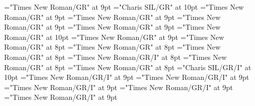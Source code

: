 \documentclass[gps1,twoside]{article}
\begin{document}
\font\spanpronunciationspansubentrysubentriesentrysubentriesdiventryletData="Times New Roman/GR" at 9pt
\font\spanbzhfonipaspanpronunciationspansubentrysubentriesentrysubentriesdiventryletData="Charis SIL/GR" at 10pt
\font\sensessubentrysubentriesentryaftersubentrysubentriesentrysubentriesdiventryletData="Times New Roman/GR" at 9pt
\font\spanspansubentrysubentriesentrysubentriesdiventryletData="Times New Roman/GR" at 9pt
\font\sensespanspansubentrysubentriesentrysubentriesdiventryletData="Times New Roman/GR" at 9pt
\font\spansensespanspansubentrysubentriesentrysubentriesdiventryletData="Times New Roman/GR" at 9pt
\font\spanenspansensespanspansubentrysubentriesentrysubentriesdiventryletData="Times New Roman/GR" at 10pt
\font\examplessensesensessubentrysubentriesentryaftersensespanspansubentrysubentriesentrysubentriesdiventryletData="Times New Roman/GR" at 9pt
\font\examplespansensespanspansubentrysubentriesentrysubentriesdiventryletData="Times New Roman/GR" at 8pt
\font\examplebeforespansensespanspansubentrysubentriesentrysubentriesdiventryletData="Times New Roman/GR" at 8pt
\font\exampleafterspansensespanspansubentrysubentriesentrysubentriesdiventryletData="Times New Roman/GR" at 8pt
\font\exampleexamplespansensespanspansubentrysubentriesentrysubentriesdiventryletData="Times New Roman/GR/I" at 8pt
\font\examplebeforeexamplespansensespanspansubentrysubentriesentrysubentriesdiventryletData="Times New Roman/GR" at 8pt
\font\exampleafterexamplespansensespanspansubentrysubentriesentrysubentriesdiventryletData="Times New Roman/GR" at 8pt
\font\spanbzhexampleexamplespansensespanspansubentrysubentriesentrysubentriesdiventryletData="Charis SIL/GR/I" at 10pt
\font\spanexampleexampleexamplessensesensessensesensessubentrysubentriesentryexamplespansensespanspansubentrysubentriesentrysubentriesdiventryletData="Times New Roman/GR/I" at 9pt
\font\translationspanexampleexampleexamplessensesensessensesensessubentrysubentriesentryexamplespansensespanspansubentrysubentriesentrysubentriesdiventryletData="Times New Roman/GR/I" at 9pt
\font\translationafterspanexampleexampleexamplessensesensessensesensessubentrysubentriesentryexamplespansensespanspansubentrysubentriesentrysubentriesdiventryletData="Times New Roman/GR/I" at 9pt
\font\translationtranslationspanexampleexampleexamplessensesensessensesensessubentrysubentriesentryexamplespansensespanspansubentrysubentriesentrysubentriesdiventryletData="Times New Roman/GR/I" at 9pt
\font\translationaftertranslationspanexampleexampleexamplessensesensessensesensessubentrysubentriesentryexamplespansensespanspansubentrysubentriesentrysubentriesdiventryletData="Times New Roman/GR/I" at 9pt
\end{document}
